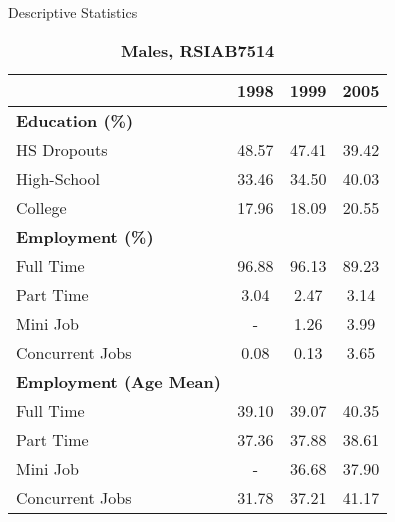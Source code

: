 \documentclass{beamer}
\begin{document}
\begin{frame}{Descriptive Statistics}
\begin{table}[htbp]
\centering
\caption{\label{} 
\textbf{Males, RSIAB7514} }
\begin{tabular} {@{} l c c c @{}} \\ \hline
\textbf{} & \textbf{1998} & \textbf{1999} & \textbf{2005} \\
\hline
\textbf{Education (\%)}   \\
HS Dropouts & 48.57&47.41&39.42 \\
High-School & 33.46&34.50&40.03\\
College 	& 17.96& 18.09&20.55 \\
\hline
\textbf{Employment (\%)}   \\
Full Time & 96.88 &96.13&89.23 \\
Part Time & 3.04 &2.47 & 3.14\\
Mini Job  & - &1.26 &3.99 \\
Concurrent Jobs  & 0.08 &0.13&3.65 \\
\hline
\textbf{Employment (Age Mean)}   \\
Full Time & 39.10 &39.07&40.35 \\
Part Time & 37.36 &37.88 & 38.61\\
Mini Job  & - &36.68 &37.90 \\
Concurrent Jobs  & 31.78 &37.21&41.17 \\
\hline
\end{tabular}
\end{table}

\end{frame}
\end{document}
